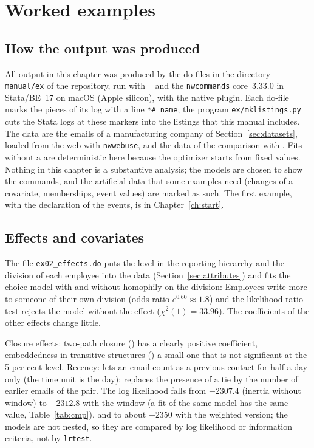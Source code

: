 \chapter{Worked examples}\label{ch:examples}

\section{How the output was produced}\label{sec:howproduced}

All output in this chapter was produced by the do-files in the directory \texttt{manual/ex} of the repository, run with \nwdynam{}~\pkgversion{} and the \texttt{nwcommands} core~3.33.0 in Stata/BE~17 on macOS (Apple silicon), with the native plugin. Each do-file marks the pieces of its log with a line \texttt{*\# name}; the program \texttt{ex/mklistings.py} cuts the Stata logs at these markers into the listings that this manual includes. The data are the emails of a manufacturing company of Section~\ref{sec:datasets}, loaded from the web with \texttt{nwwebuse}, and the data of the comparison with \goldfish{}. Fits without a  are deterministic here because the optimizer starts from fixed values. Nothing in this chapter is a substantive analysis; the models are chosen to show the commands, and the artificial data that some examples need (changes of a covariate, memberships, event values) are marked as such. The first example, with the declaration of the events, is in Chapter~\ref{ch:start}.

\section{Effects and covariates}\label{sec:ex_effects}

The file \texttt{ex02\_effects.do} puts the level in the reporting hierarchy and the division of each employee into the data (Section~\ref{sec:attributes}) and fits the choice model with and without homophily on the division:
Employees write more to someone of their own division (odds ratio $e^{0.60}\approx1.8$) and the likelihood-ratio test rejects the model without the effect ($\chi^2(1)=33.96$). The coefficients of the other effects change little.

Closure effects: two-path closure () has a clearly positive coefficient, embeddedness in transitive structures () a small one that is not significant at the 5 per cent level.
Recency:  lets an email count as a previous contact for half a day only (the time unit is the day);  replaces the presence of a tie by the number of earlier emails of the pair.
The log likelihood falls from $-2307.4$ (inertia without window) to $-2312.8$ with the window (a \goldfish{} fit of the same model has the same value, Table~\ref{tab:cmp}), and to about $-2350$ with the weighted version; the models are not nested, so they are compared by log likelihood or information criteria, not by \texttt{lrtest}.

